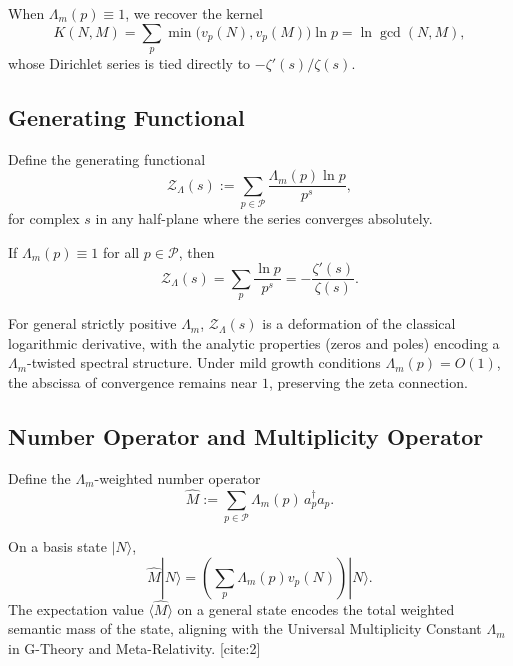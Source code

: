 \documentclass[11pt]{article}
\begin{document}
When $\Lambda_m(p) \equiv 1$, we recover the kernel
\[
  K(N,M) = \sum_{p} \min\bigl(v_p(N), v_p(M)\bigr) \ln p
         = \ln \gcd(N,M),
\]
whose Dirichlet series is tied directly to $-\zeta'(s)/\zeta(s)$.

\subsection{Generating Functional}

\begin{definition}
Define the generating functional
\[
  \mathcal{Z}_{\Lambda}(s)
    := \sum_{p \in \mathcal{P}}
       \frac{\Lambda_m(p) \ln p}{p^s},
\]
for complex $s$ in any half-plane where the series converges
absolutely.
\end{definition}

\begin{proposition}
If $\Lambda_m(p) \equiv 1$ for all $p \in \mathcal{P}$, then
\[
  \mathcal{Z}_{\Lambda}(s)
    = \sum_{p} \frac{\ln p}{p^s}
    = - \frac{\zeta'(s)}{\zeta(s)}.
\]
\end{proposition}

For general strictly positive $\Lambda_m$, $\mathcal{Z}_{\Lambda}(s)$
is a deformation of the classical logarithmic derivative, with the
analytic properties (zeros and poles) encoding a $\Lambda_m$-twisted
spectral structure. Under mild growth conditions
$\Lambda_m(p) = O(1)$, the abscissa of convergence remains near
$1$, preserving the zeta connection.

\subsection{Number Operator and Multiplicity Operator}

\begin{definition}
Define the $\Lambda_m$-weighted number operator
\[
  \hat{M}
    := \sum_{p \in \mathcal{P}}
       \Lambda_m(p) \, a_p^\dagger a_p.
\]
\end{definition}

On a basis state $|N\rangle$,
\[
  \hat{M} |N\rangle
    = \left( \sum_{p} \Lambda_m(p) v_p(N) \right) |N\rangle.
\]
The expectation value $\langle \hat{M} \rangle$ on a general state
encodes the total weighted semantic mass of the state, aligning
with the Universal Multiplicity Constant $\Lambda_m$ in G-Theory
and Meta-Relativity. [cite:2]
\end{document}
